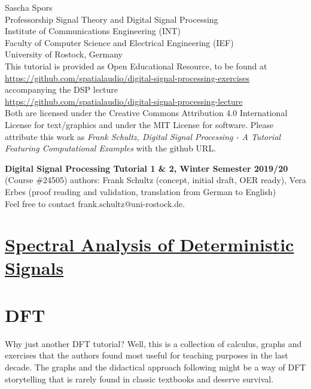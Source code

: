 \documentclass[11pt,a4paper,DIV=12]{scrartcl}
\begin{document}
{\raggedleft Sascha Spors\\
Professorship Signal Theory and Digital Signal Processing\\
Institute of Communications Engineering (INT)\\
Faculty of Computer Science and Electrical Engineering (IEF)\\
University of Rostock, Germany\\}
\vspace{0.5cm}
\noindent This tutorial is provided as Open Educational Resource, to be found at\\
\url{https://github.com/spatialaudio/digital-signal-processing-exercises}\\
accompanying the DSP lecture\\
\url{https://github.com/spatialaudio/digital-signal-processing-lecture}\\
Both are licensed under the Creative Commons Attribution 4.0 International
License for text/graphics and under the MIT License for software. Please
attribute this work as \textit{Frank Schultz, Digital Signal Processing - A
Tutorial Featuring Computational Examples} with the github URL.
\newline

\textbf{Digital Signal Processing Tutorial 1 \& 2, Winter Semester 2019/20}
(Course \#24505)
authors: Frank Schultz (concept, initial draft, OER ready),
Vera Erbes (proof reading and validation, translation from German to English)\\
Feel free to contact frank.schultz@uni-rostock.de.

\section*{\underline{Spectral Analysis of Deterministic Signals}}
\renewcommand{\contentsname}{}
\tableofcontents
\vspace{.7cm}

\clearpage
\section{DFT}
Why just another DFT tutorial? Well, this is a collection of calculus,
graphs and exercises that the authors found most useful for teaching purposes
in the last decade.
The graphs and the didactical approach following \cite{Moeser2011} might be
a way of DFT storytelling that is rarely found in classic textbooks
and deserve survival.
\end{document}
